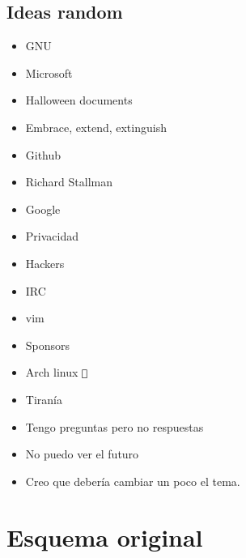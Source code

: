 \documentclass[12pt, twoside]{article}
\newcommand{\btw}{{\color{arch}\texttt{ }} }
\begin{document}
\subsection{Ideas random}%
\label{sub:Ideas random}
\begin{itemize}
	\item GNU
	\item Microsoft
	\item Halloween documents
	\item Embrace, extend, extinguish
	\item Github
	\item Richard Stallman
	\item Google
	\item Privacidad
	\item Hackers
	\item IRC
	\item vim
	\item Sponsors
	\item Arch linux \btw
	\item Tiranía
	\item Tengo preguntas pero no respuestas
	\item No puedo ver el futuro
	\item Creo que debería cambiar un poco el tema.
\end{itemize}
\section{Esquema original}%
\label{sec:Esquema original}
\end{document}

